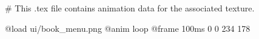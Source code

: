 # This .tex file contains animation data for the associated texture.

@load ui/book_menu.png
@anim loop
	@frame 100ms 0 0 234 178
